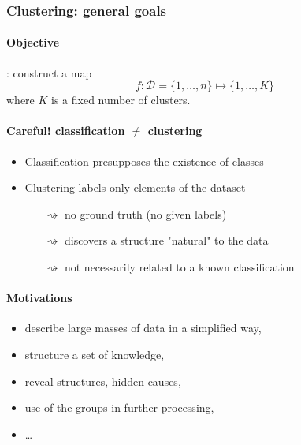 \documentclass{beamer}\usepackage[]{graphicx}\usepackage[]{color}
\begin{document}
\begin{frame}[label=Clustering1]
  \frametitle{Clustering: general goals}

  \paragraph{Objective}: construct a map 
  \[
    f : \mathcal{D} = \{1,\dots,n\} \mapsto  \{1,\ldots,K\}
  \]
  where $K$ is a fixed number of clusters.
    
  \vfill
    
  \paragraph{Careful! classification $\neq$ clustering}
      \begin{itemize}
      \item Classification presupposes the existence of classes
      \item Clustering labels only elements of the dataset
      \begin{itemize}
      \item[$\rightsquigarrow$] no ground truth (no given labels)
      \item[$\rightsquigarrow$] discovers a structure "natural" to the data
      \item[$\rightsquigarrow$] not necessarily related to a known classification
      \end{itemize}
      \end{itemize}
  
  \vfill

  \paragraph{Motivations}
    \begin{itemize}
    \item describe large masses of data in a simplified way,
    \item structure a set of knowledge,
    \item reveal structures, hidden causes,
    \item use of the groups in further processing, 
    \item \dots
  \end{itemize}

\end{frame}
\end{document}

